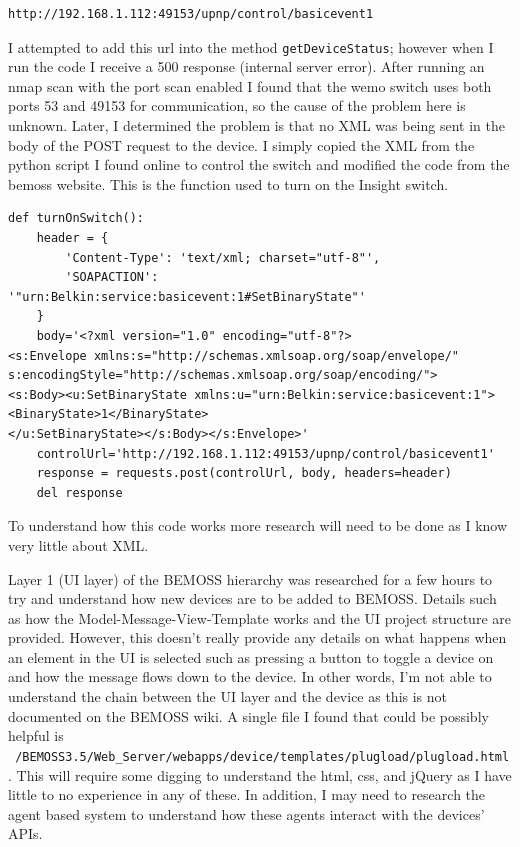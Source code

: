 \documentclass[fontsize=11pt, %
                             paper=letter, %
                             twoside, %
                             captions=tableheading,
                             index=totoc,
                             hyperref]{labbook}
\begin{document}
\begin{addmargin}[0cm]{0cm}
\begin{verbatim}
http://192.168.1.112:49153/upnp/control/basicevent1
\end{verbatim}
I attempted to add this url into the method \texttt{getDeviceStatus}; however when I run the code I receive a 500 response (internal server error). After running an nmap scan with the port scan enabled I found that the wemo switch uses both ports 53 and 49153 for communication, so the cause of the problem here is unknown. Later, I determined the problem is that no XML was being sent in the body of the POST request to the device. I simply copied the XML from the python script I found online to control the switch and modified the code from the bemoss website. This is the function used to turn on the Insight switch.
\begin{Verbatim}[tabsize=4]
def turnOnSwitch():
	header = {
		'Content-Type': 'text/xml; charset="utf-8"',
		'SOAPACTION': '"urn:Belkin:service:basicevent:1#SetBinaryState"'
	}
	body='<?xml version="1.0" encoding="utf-8"?>
<s:Envelope xmlns:s="http://schemas.xmlsoap.org/soap/envelope/" 
s:encodingStyle="http://schemas.xmlsoap.org/soap/encoding/">
<s:Body><u:SetBinaryState xmlns:u="urn:Belkin:service:basicevent:1">
<BinaryState>1</BinaryState>
</u:SetBinaryState></s:Body></s:Envelope>'
	controlUrl='http://192.168.1.112:49153/upnp/control/basicevent1'
	response = requests.post(controlUrl, body, headers=header)
	del response																																										
\end{Verbatim}
To understand how this code works more research will need to be done as I know very little about XML.

Layer 1 (UI layer) of the BEMOSS hierarchy was researched for a few hours to try and understand how new devices are to be added to BEMOSS. Details such as how the 	Model-Message-View-Template works and the UI project structure are provided. However, this doesn't really provide any details on what happens when an element in the UI is selected such as pressing a button to toggle a device on and how the message flows down to the device. In other words, I'm not able to understand the chain between the UI layer and the device as this is not documented on the BEMOSS wiki. A single file I found that could be possibly helpful is \texttt{~/BEMOSS3.5/Web\_Server/webapps/device/templates/plugload/plugload.html}. This will require some digging to understand the html, css, and jQuery as I have little to no experience in any of these. In addition, I may need to research the agent based system to understand how these agents interact with the devices' APIs.   


\end{addmargin}
\end{document}

